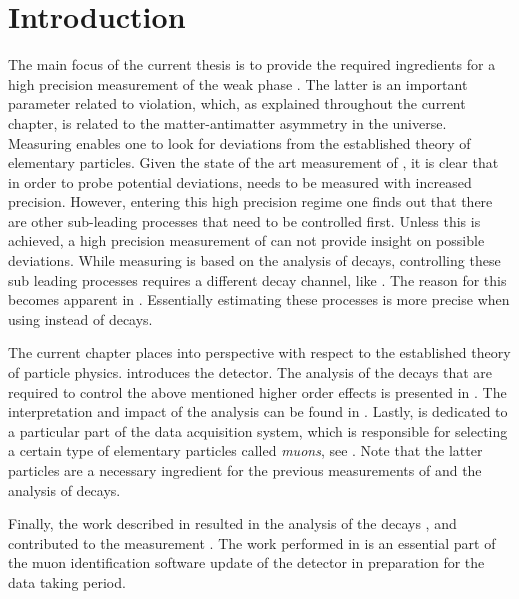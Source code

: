 
\chapter{Introduction}
\label{Introduction}

The main focus of the current thesis is to provide the required ingredients for a high precision measurement of
the weak phase \phis. The latter is an important parameter related to \CP violation, which, as explained throughout
the current chapter, is related to the matter-antimatter asymmetry in the universe. Measuring \phis enables one to look
for deviations from the established theory of elementary particles. Given the state of the art measurement of \phis \cite{phis-3fb-paper},
it is clear that in order to probe potential deviations, \phis needs to be measured with increased precision.
However, entering this high precision regime one finds out that there are other sub-leading processes that need to be
controlled first. Unless this is achieved, a high precision measurement of \phis can not provide insight on possible
deviations. While measuring \phis is based on the analysis of \BsJpsiPhi decays, controlling these sub leading processes
requires a different decay channel, like \BsJpsiKst. The reason for this becomes apparent in .
Essentially estimating these processes is more precise when using \BsJpsiKst instead of \BsJpsiPhi decays.

The current chapter places \phis into perspective with respect to the established theory of particle physics.
 introduces the \lhcb detector. The analysis of the \BsJpsiKst decays that are
required to control the above mentioned higher order effects is presented in .
The interpretation and impact of the analysis can be found in .
Lastly,  is dedicated to a particular part of the \lhcb data acquisition system,
which is responsible for selecting a certain type of elementary particles called {\it muons}, see .
Note that the latter particles are a necessary ingredient for the previous measurements of \phis and
the analysis of \BsJpsiKst decays.

Finally, the work described in  resulted in the analysis of the \BsJpsiKst
decays \cite{bsjpsikst-paper}, and contributed to the \phis measurement \cite{phis-3fb-paper}.
The work performed in  is an essential part of the muon identification
software update \cite{Albrecht:2253050} of the \lhcb detector in preparation for the \runtwo data taking period.


